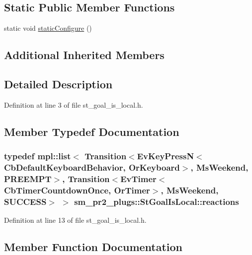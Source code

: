 \subsection*{Static Public Member Functions}
\begin{DoxyCompactItemize}
\item 
static void \hyperlink{structsm__pr2__plugs_1_1StGoalIsLocal_a7fde75ffa3d95e2f5153c35596817ab4}{static\+Configure} ()
\end{DoxyCompactItemize}
\subsection*{Additional Inherited Members}


\subsection{Detailed Description}


Definition at line 3 of file st\+\_\+goal\+\_\+is\+\_\+local.\+h.



\subsection{Member Typedef Documentation}
\subsubsection[{\texorpdfstring{reactions}{reactions}}]{\setlength{\rightskip}{0pt plus 5cm}typedef mpl\+::list$<$ Transition$<$Ev\+Key\+PressN$<$Cb\+Default\+Keyboard\+Behavior, {\bf Or\+Keyboard}$>$, {\bf Ms\+Weekend}, {\bf P\+R\+E\+E\+M\+PT}$>$, Transition$<$Ev\+Timer$<$Cb\+Timer\+Countdown\+Once, {\bf Or\+Timer}$>$, {\bf Ms\+Weekend}, {\bf S\+U\+C\+C\+E\+SS}$>$ $>$ {\bf sm\+\_\+pr2\+\_\+plugs\+::\+St\+Goal\+Is\+Local\+::reactions}}\hypertarget{structsm__pr2__plugs_1_1StGoalIsLocal_a17b287ba0fef5b866b0454cccc52d341}{}\label{structsm__pr2__plugs_1_1StGoalIsLocal_a17b287ba0fef5b866b0454cccc52d341}


Definition at line 13 of file st\+\_\+goal\+\_\+is\+\_\+local.\+h.



\subsection{Member Function Documentation}
